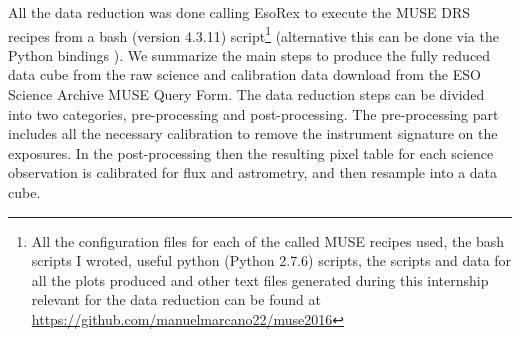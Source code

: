All the data reduction was done calling EsoRex to execute the MUSE DRS recipes from a bash (version 4.3.11) script\footnote{All the configuration files for each of the called MUSE recipes used, the bash scripts I wroted, useful python (Python 2.7.6) scripts, the scripts and data for all the plots produced and other text files generated during this internship relevant for the data reduction can be found at \url{https://github.com/manuelmarcano22/muse2016}} (alternative this can be done via the Python bindings \citep{streicher_python_2012}). We summarize the main steps to produce the fully reduced data cube from the raw science and calibration data download from the ESO Science Archive MUSE Query Form. The data reduction steps can be divided into two categories, pre-processing and post-processing. The pre-processing part includes all the necessary calibration to remove the instrument signature on the exposures. In the post-processing then the resulting pixel table for each science observation is calibrated for flux and astrometry, and then resample into a data cube.

